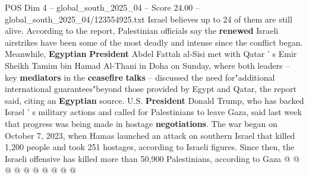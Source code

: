 \begin{textsample}{POS Dim 4 – global\_south\_2025\_04 – Score 24.00 – global\_south\_2025\_04/123554925.txt}
Israel believes up to 24 of them are still alive.
According to the report, Palestinian officials say the \textbf{renewed} Israeli airstrikes have been some of the most deadly and intense since the conflict began.
Meanwhile, \textbf{Egyptian} \textbf{President} Abdel Fattah al-Sisi met with Qatar ' s Emir Sheikh Tamim bin Hamad Al-Thani in Doha on Sunday, where both leaders -- key \textbf{mediators} in the \textbf{ceasefire} \textbf{talks} -- discussed the need for"additional international guarantees"beyond those provided by Egypt and Qatar, the report said, citing an \textbf{Egyptian} source.
U.S. \textbf{President} Donald Trump, who has backed Israel ' s military actions and called for Palestinians to leave Gaza, said last week that progress was being made in hostage \textbf{negotiations}.
The war began on October 7, 2023, when Hamas launched an attack on southern Israel that killed 1,200 people and took 251 hostages, according to Israeli figures.
Since then, the Israeli offensive has killed more than 50,900 Palestinians, according to Gaza @ @ @ @ @ @ @ @ @ @

\end{textsample}
